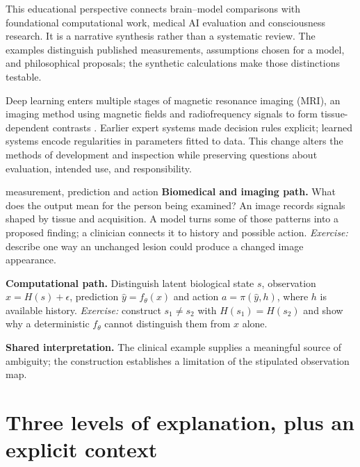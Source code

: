 \documentclass[11pt,a4paper]{article}
\begin{document}
This educational perspective connects brain--model comparisons with foundational computational work, medical AI evaluation and consciousness research. It is a narrative synthesis rather than a systematic review. The examples distinguish published measurements, assumptions chosen for a model, and philosophical proposals; the synthetic calculations make those distinctions testable.

Deep learning enters multiple stages of magnetic resonance imaging (MRI), an imaging method using magnetic fields and radiofrequency signals to form tissue-dependent contrasts \citep{lundervold2019}. Earlier expert systems made decision rules explicit; learned systems encode regularities in parameters fitted to data. This change alters the methods of development and inspection while preserving questions about evaluation, intended use, and responsibility.

\begin{perspectives}{measurement, prediction and action}
\textbf{Biomedical and imaging path.} What does the output mean for the person being examined? An image records signals shaped by tissue and acquisition. A model turns some of those patterns into a proposed finding; a clinician connects it to history and possible action. \emph{Exercise:} describe one way an unchanged lesion could produce a changed image appearance.

\textbf{Computational path.} Distinguish latent biological state $s$, observation $x=H(s)+\epsilon$, prediction $\hat y=f_\theta(x)$ and action $a=\pi(\hat y,h)$, where $h$ is available history. \emph{Exercise:} construct $s_1\neq s_2$ with $H(s_1)=H(s_2)$ and show why a deterministic $f_\theta$ cannot distinguish them from $x$ alone.

\textbf{Shared interpretation.} The clinical example supplies a meaningful source of ambiguity; the construction establishes a limitation of the stipulated observation map.
\end{perspectives}


\section{Three levels of explanation, plus an explicit context}\label{sec:marr}
\end{document}
